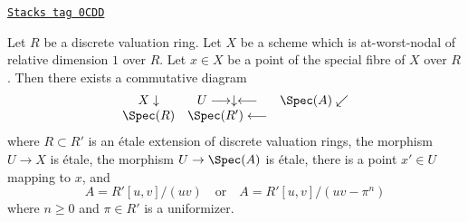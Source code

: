 \begin{lemma}
\label{models-lemma-etale-local-at-worst-nodal}
\href{https://stacks.math.columbia.edu/tag/0CDD}{\texttt{Stacks tag 0CDD}}

Let $R$ be a discrete valuation ring. Let $X$ be a scheme which is
at-worst-nodal of relative dimension $1$ over $R$.
Let $x \in X$ be a point of the special fibre
of $X$ over $R$. Then there exists a commutative diagram
$$
\begin{array}{ccc}X \downarrow & U \longrightarrow\downarrow\longleftarrow & \Spec(A) \swarrow \\ \Spec(R) & \Spec(R') \longleftarrow & \end{array}
$$
where $R \subset R'$ is an \'etale extension of discrete valuation rings,
the morphism $U \to X$ is \'etale, the morphism $U \to \Spec(A)$ is \'etale,
there is a point $x' \in U$ mapping to $x$, and
$$
A = R'[u, v]/(uv)
\quad\text{or}\quad
A = R'[u, v]/(uv - \pi^n)
$$
where $n \geq 0$ and $\pi \in R'$ is a uniformizer.
\end{lemma}

